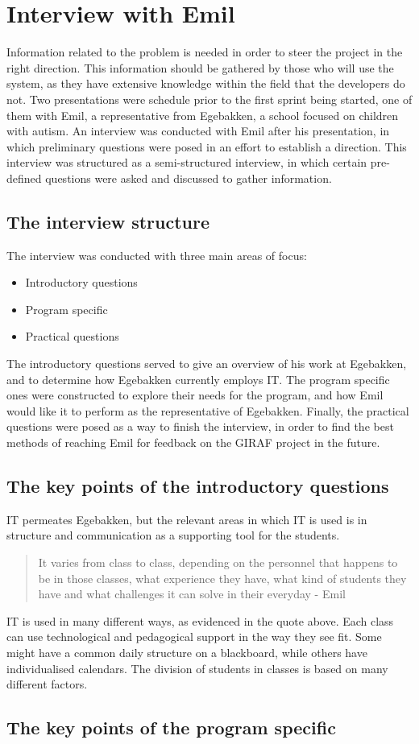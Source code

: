 \section{Interview with Emil}
Information related to the problem is needed in order to steer the project in the right direction.
This information should be gathered by those who will use the system, as they have extensive knowledge within the field that the developers do not.
Two presentations were schedule prior to the first sprint being started, one of them with Emil, a representative from Egebakken, a school focused on children with autism.
An interview was conducted with Emil after his presentation, in which preliminary questions were posed in an effort to establish a direction.
This interview was structured as a semi-structured interview, in which certain pre-defined questions were asked and discussed to gather information.

\subsection{The interview structure}
The interview was conducted with three main areas of focus:
\begin{itemize}
    \item Introductory questions
    \item Program specific
    \item Practical questions 
\end{itemize}
\noindent
The introductory questions served to give an overview of his work at Egebakken, and to determine how Egebakken currently employs IT.
The program specific ones were constructed to explore their needs for the program, and how Emil would like it to perform as the representative of Egebakken.
Finally, the practical questions were posed as a way to finish the interview, in order to find the best methods of reaching Emil for feedback on the GIRAF project in the future.

\subsection{The key points of the introductory questions}
IT permeates Egebakken, but the relevant areas in which IT is used is in structure and communication as a supporting tool for the students.

\begin{quote}
    It varies from class to class, depending on the personnel that happens to be in those classes, what experience they have, what kind of students they have and what challenges it can solve in their everyday - Emil
\end{quote}
IT is used in many different ways, as evidenced in the quote above. Each class can use technological and pedagogical support in the way they see fit.
Some might have a common daily structure on a blackboard, while others have individualised calendars.
The division of students in classes is based on many different factors. 

\subsection{The key points of the program specific}